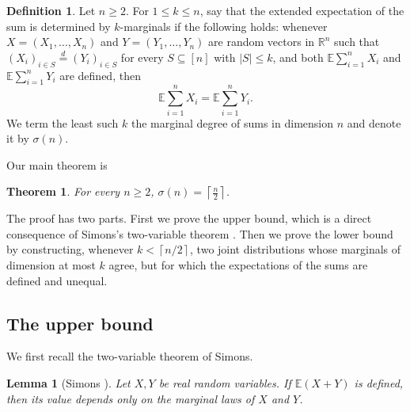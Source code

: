 \documentclass[11pt]{amsart}
\theoremstyle{plain}
\newtheorem{theorem}{Theorem}
\newtheorem{lemma}{Lemma}
\theoremstyle{definition}
\newtheorem{definition}{Definition}
\theoremstyle{remark}
\numberwithin{equation}{section}
\newcommand{\R}{\mathbb R}
\newcommand{\E}{\mathbb E}
\newcommand{\1}{\mathbf 1}
\begin{document}
\begin{definition}
Let \(n\ge2\). For \(1\le k\le n\), say that the extended expectation of the sum is determined by \(k\)-marginals if the following holds: whenever \(X=\left(X_1,\ldots,X_n\right)\) and \(Y=\left(Y_1,\ldots,Y_n\right)\) are random vectors in \(\R^n\) such that \(\left(X_i\right)_{i\in S}\stackrel{d}=\left(Y_i\right)_{i\in S}\) for every \(S\subseteq\left[n\right]\) with \(\lvert S\rvert\le k\), and both \(\E\sum_{i=1}^nX_i\) and \(\E\sum_{i=1}^nY_i\) are defined, then
\[
\E\sum_{i=1}^nX_i=\E\sum_{i=1}^nY_i.
\]
We term the least such \(k\) the marginal degree of sums in dimension \(n\) and denote it by \(\sigma\left(n\right)\).
\end{definition}

Our main theorem is
\begin{theorem}
For every \(n\ge2\), \(\sigma\left(n\right)=\left\lceil\frac{n}{2}\right\rceil\).
\end{theorem}

The proof has two parts. First we prove the upper bound, which is a direct consequence of Simons's two-variable theorem \cite{Simons1977Unexpected}. Then we prove the lower bound by constructing, whenever \(k<\left\lceil n/2\right\rceil\), two joint distributions whose marginals of dimension at most \(k\) agree, but for which the expectations of the sums are defined and unequal.

\subsection{The upper bound}

We first recall the two-variable theorem of Simons.

\begin{lemma}[Simons \cite{Simons1977Unexpected}]
Let \(X,Y\) be real random variables. If \(\E\left(X+Y\right)\) is defined, then its value depends only on the marginal laws of \(X\) and \(Y\).
\end{lemma}
\end{document}
